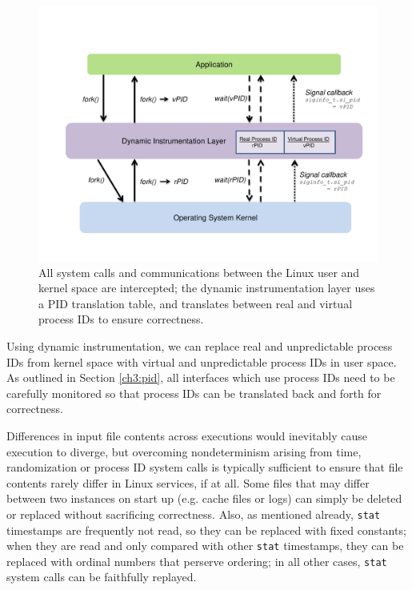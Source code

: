 \begin{figure}[h]
  \center
  \includegraphics[trim=0cm 1cm 0cm 0.5cm, scale=0.60]{pid.pdf}
  \caption[Virtualizing the process ID layer using Pin]%
  {All system calls and communications
  between the Linux user and kernel space are intercepted; 
  the dynamic instrumentation layer
  uses a PID translation table, and
  translates between real and virtual process IDs
  to ensure correctness. }
  
  \label{ch3:pidfig}
\end{figure} 

Using dynamic instrumentation, we can replace
real and unpredictable process IDs from kernel space
with virtual and unpredictable process IDs in user space.
As outlined in Section \ref{ch3:pid}, all interfaces
which use process IDs need to be carefully monitored
so that process IDs can be translated back and forth
for correctness. \newline

 \newline
Differences in input file contents across
executions would inevitably cause execution
to diverge, but overcoming nondeterminism arising
from time, randomization or process ID system calls
is typically sufficient to ensure that
file contents rarely differ in Linux services,
if at all. Some files that may differ
between two instances on start up (e.g. 
cache files or logs) can simply be 
deleted or replaced without sacrificing correctness.
Also, as mentioned already, \texttt{stat} 
timestamps are frequently not read, so
they can be replaced with fixed constants;
when they are read and only compared with other
\texttt{stat} timestamps, they can be replaced with 
ordinal numbers that perserve ordering;  
in all other cases, \texttt{stat} system calls 
can be faithfully replayed. \newline

